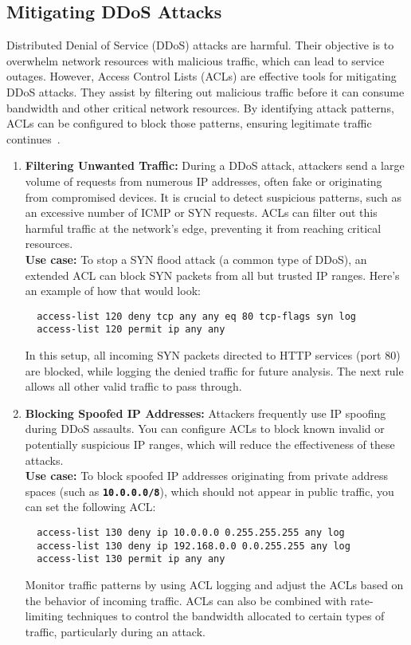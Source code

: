 \documentclass[11pt,a4paper]{article}
\begin{document}
    \subsection*{Mitigating DDoS Attacks}
    Distributed Denial of Service (DDoS) attacks are harmful. Their objective is to overwhelm network resources with malicious traffic, which can lead to service outages. However, Access Control Lists (ACLs) are effective tools for mitigating DDoS attacks. They assist by filtering out malicious traffic before it can consume bandwidth and other critical network resources. By identifying attack patterns, ACLs can be configured to block those patterns, ensuring legitimate traffic continues~\cite{DDoS-Attacks}\cite{DDoS-Attacks-2}.
    \begin{enumerate}
        \item \textbf{Filtering Unwanted Traffic:} During a DDoS attack, attackers send a large volume of requests from numerous IP addresses, often fake or originating from compromised devices. It is crucial to detect suspicious patterns, such as an excessive number of ICMP or SYN requests. ACLs can filter out this harmful traffic at the network's edge, preventing it from reaching critical resources.
        \\[1em]
        \textbf{Use case:} To stop a SYN flood attack (a common type of DDoS), an extended ACL can block SYN packets from all but trusted IP ranges. Here’s an example of how that would look:
\begin{lstlisting}
  access-list 120 deny tcp any any eq 80 tcp-flags syn log
  access-list 120 permit ip any any                                      
\end{lstlisting}
        In this setup, all incoming SYN packets directed to HTTP services (port 80) are blocked, while logging the denied traffic for future analysis. The next rule allows all other valid traffic to pass through.

        \item \textbf{Blocking Spoofed IP Addresses:} Attackers frequently use IP spoofing during DDoS assaults. You can configure ACLs to block known invalid or potentially suspicious IP ranges, which will reduce the effectiveness of these attacks.
        \\[1em]
        \textbf{Use case:} To block spoofed IP addresses originating from private address spaces (such as \textbf{\lstinline{10.0.0.0/8}}), which should not appear in public traffic, you can set the following ACL:
\begin{lstlisting}
  access-list 130 deny ip 10.0.0.0 0.255.255.255 any log
  access-list 130 deny ip 192.168.0.0 0.0.255.255 any log
  access-list 130 permit ip any any                                                 
\end{lstlisting}
        Monitor traffic patterns by using ACL logging and adjust the ACLs based on the behavior of incoming traffic. ACLs can also be combined with rate-limiting techniques to control the bandwidth allocated to certain types of traffic, particularly during an attack.

    \end{enumerate}
\end{document}
